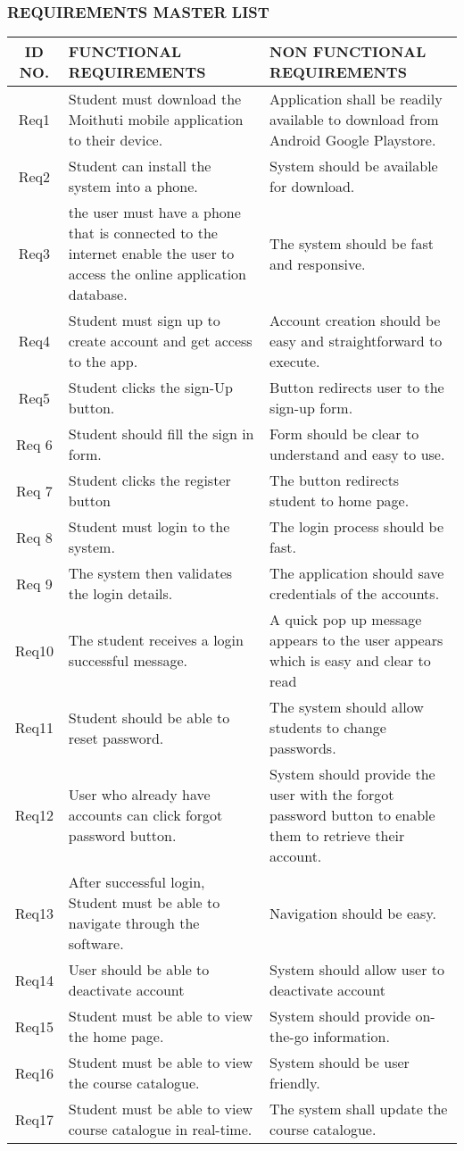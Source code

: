 \subsubsection{REQUIREMENTS MASTER LIST}
\begin{table}[ht]
	\centering
	\begin{tabular}{|c|p{7cm}|p{7cm}|}
		\hline
		ID NO. & FUNCTIONAL REQUIREMENTS & NON FUNCTIONAL REQUIREMENTS\\
		\hline
		Req1 & Student must download the Moithuti mobile application to
		their device.&Application shall be readily available to download from Android Google Playstore.\\
		\hline
		Req2 & Student can install the system into a phone. & System should be available for download.\\
		\hline
		Req3& the user must have a phone that is connected to the internet enable the user to access the online application database.& The system should be fast and responsive.\\
		\hline
		Req4& Student must sign up to create account and get access to the app. & Account creation should be easy and straightforward to execute.\\
		\hline
		Req5 & Student clicks the sign-Up button.&Button redirects user to the sign-up form.\\
		\hline
		Req 6 &Student should fill the sign in form. &Form should be clear to understand and easy to use.\\
		\hline
		Req 7&Student clicks the register button &The button redirects student to home page.\\
		\hline
		Req 8& Student must login to the system.& The login process should be fast.\\
		\hline
		Req 9&The system then validates the login details. &The application should save credentials of the accounts.\\
		\hline
		Req10&The student receives a login successful message. & A quick pop up message appears to the user appears which is easy and clear to read\\
		\hline
		Req11 &Student should be able to reset password. &The system should allow students to change passwords.\\
		\hline
		Req12&User who already have accounts can click forgot password button. &System should provide the user with the forgot password button to enable them to retrieve their account.\\
		\hline
		Req13 & After successful login, Student must be able to navigate through the software.& Navigation should be easy.\\
		\hline
		Req14 &User should be able to deactivate account & System should allow user to deactivate account\\
		\hline
		Req15 & Student must be able to view the home page.&System should provide on-the-go information.\\
		\hline
		Req16 & Student must be able to view the course catalogue.&System should be user friendly.\\
		\hline
		Req17 & Student must be able to view course catalogue in real-time. & The system shall update the course catalogue.\\
		\hline
		

\end{tabular}
\end{table}
